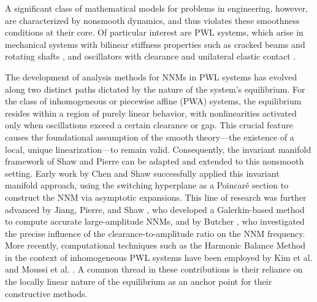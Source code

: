 \documentclass[a4paper,9pt,parskip=half,english]{article}
\theoremstyle{plain}
\theoremstyle{definition}
\begin{document}
A significant class of mathematical models for problems in engineering, however, are characterized by nonsmooth dynamics, and thus violates these smoothness conditions at their core. Of particular interest are PWL systems, which arise in mechanical systems with bilinear stiffness properties such as cracked beams and rotating shafts \cite{Zuo1994, Chati1997, Vestroni2008}, and oscillators with clearance and unilateral elastic contact \cite{Chen1996,Butcher1999}.

The development of analysis methods for NNMs in PWL systems has evolved along two distinct paths dictated by the nature of the system's equilibrium. For the class of inhomogeneous or piecewise affine (PWA) systems, the equilibrium resides within a region of purely linear behavior, with nonlinearities activated only when oscillations exceed a certain clearance or gap. This crucial feature causes the foundational assumption of the smooth theory—the existence of a local, unique linearization—to remain valid. Consequently, the invariant manifold framework of Shaw and Pierre can be adapted and extended to this nonsmooth setting. Early work by Chen and Shaw \cite{Chen1996} successfully applied this invariant manifold approach, using the switching hyperplane as a Poincaré section to construct the NNM via asymptotic expansions. This line of research was further advanced by Jiang, Pierre, and Shaw \cite{Jiang2004}, who developed a Galerkin-based method to compute accurate large-amplitude NNMs, and by Butcher \cite{Butcher1999}, who investigated the precise influence of the clearance-to-amplitude ratio on the NNM frequency. More recently, computational techniques such as the Harmonic Balance Method in the context of inhomogeneous PWL systems have been employed by Kim et al. \cite{Kim2005} and Moussi et al. \cite{Moussi2015}. A common thread in these contributions is their reliance on the locally linear nature of the equilibrium as an anchor point for their constructive methods. 
\end{document}
